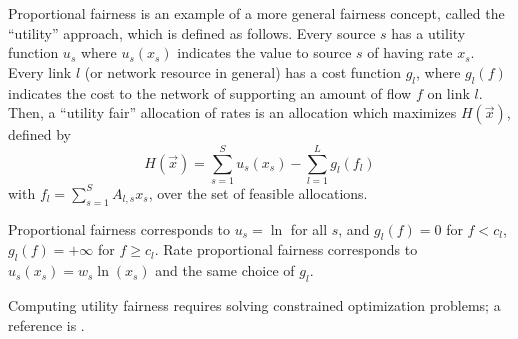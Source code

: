 Proportional fairness is an example of a more general fairness
concept, called the ``utility'' approach, which is defined as
follows. Every source $s$ has a utility function $u_{s}$ where
$u_{s}(x_{s})$ indicates the value to source $s$ of having
rate $x_{s}$. Every link $l$ (or network resource in general)
has a cost function $g_{l}$,  where $g_{l}(f)$ indicates the
cost to the network of supporting an amount of flow $f$ on
link $l$. Then, a ``utility fair'' allocation of rates is an
allocation which maximizes $H(\vec{x})$, defined by
$$H(\vec{x}) = \sum_{s=1}^S u_{s}(x_{s}) - \sum_{l=1}^L g_{l}(f_{l})
$$
with $f_{l}=\sum_{s=1}^S A_{l,s}x_{s}$, over the set of
feasible allocations.

Proportional fairness corresponds to $u_{s}= \ln$ for all $s$,
and $g_{l}(f)=0$ for $f< c_{l}$, $g_{l}(f)=+ \infty$ for
$f\geq c_{l}$. Rate proportional fairness corresponds to
$u_{s}(x_{s})= w_{s}\ln(x_{s})$ and the same choice of
$g_{l}$.

Computing utility fairness requires solving constrained
optimization problems; a reference is \cite{WHI}.
